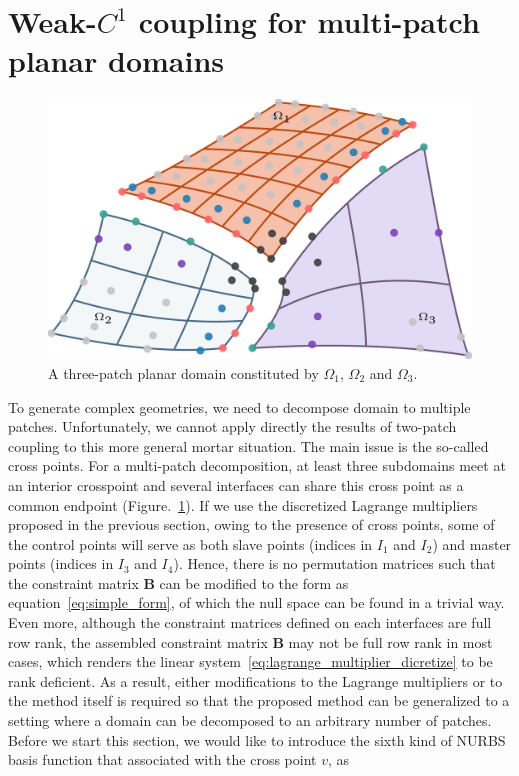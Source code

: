 \documentclass[preprint,12pt]{elsarticle}
\begin{document}
\section{Weak-$C^1$ coupling for multi-patch planar domains}
\begin{figure}
    \centering
    \includegraphics[width=\linewidth]{three_planar_patches}
    \caption{A three-patch planar domain constituted by $\Omega_1$, $\Omega_2$ and $\Omega_3$.}\label{fig:three_planar_patches}
\end{figure}
To generate complex geometries, we need to decompose domain to multiple patches. Unfortunately, we cannot apply directly the results of two-patch coupling to this more general mortar situation. The main issue is the so-called cross points. For a multi-patch decomposition, at least three subdomains meet at an interior crosspoint and several interfaces can share this cross point as a common endpoint (Figure.~\ref{fig:three_planar_patches}). If we use the discretized Lagrange multipliers proposed in the previous section, owing to the presence of cross points, some of the control points will serve as both slave points (indices in $I_1$ and $I_2$) and master points (indices in $I_3$ and $I_4$). Hence, there is no permutation matrices such that the constraint matrix $\mathbf{B}$ can be modified to the form as equation~\eqref{eq:simple_form}, of which the null space can be found in a trivial way. Even more, although the constraint matrices defined on each interfaces are full row rank, the assembled constraint matrix $\mathbf{B}$ may not be full row rank in most cases, which renders the linear system~\eqref{eq:lagrange_multiplier_dicretize} to be rank deficient. As a result, either modifications to the Lagrange multipliers or to the method itself is required so that the proposed method can be generalized to a setting where a domain can be decomposed to an arbitrary number of patches. Before we start this section, we would like to introduce the sixth kind of NURBS basis function that associated with the cross point $v$, as
\end{document}

